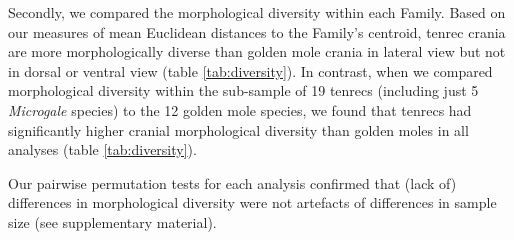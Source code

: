 \documentclass[12pt,a4paper]{article}
\begin{document}
	Secondly, we compared the morphological diversity within each Family. Based on our measures of mean Euclidean distances to the Family's centroid, tenrec crania are more morphologically diverse than golden mole crania in lateral view but not in dorsal or ventral view (table \ref{tab:diversity}). In contrast, when we compared morphological diversity within the sub-sample of 19 tenrecs (including just 5 \textit{Microgale} species) to the 12 golden mole species, we found that tenrecs had significantly higher cranial morphological diversity than golden moles in all analyses (table \ref{tab:diversity}).

	Our pairwise permutation tests for each analysis confirmed that (lack of) differences in morphological diversity were not artefacts of differences in sample size (see supplementary material).


	\begin{table}[h]			
	\caption[Comparison of morphological diversity in tenrecs and golden moles.]
	 
	\label{tab:diversity}  
	\end{table}
\end{document}

